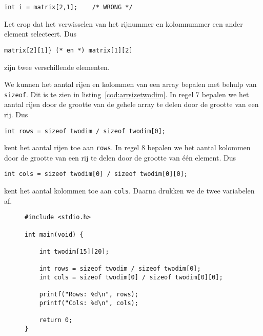 \begin{lstlisting}[style=lstoneline]
int i = matrix[2,1];    /* WRONG */
\end{lstlisting}

Let erop dat het verwisselen van het rijnummer en kolomnummer een ander element selecteert. Dus

\begin{lstlisting}[style=lstoneline]
matrix[2][1]} (* en *) matrix[1][2]
\end{lstlisting}

zijn twee verschillende elementen.

We kunnen het aantal rijen en kolommen van een array bepalen met behulp van \texttt{sizeof}. Dit is te zien in listing~\ref{cod:arrsizetwodim}.
In regel 7 bepalen we het aantal rijen door de grootte van de gehele array te delen door de grootte van een rij. Dus

\begin{lstlisting}[style=lstoneline]
int rows = sizeof twodim / sizeof twodim[0];
\end{lstlisting}

kent het aantal rijen toe aan \texttt{rows}. In regel 8 bepalen we het aantal kolommen door de grootte van een rij te delen door de grootte van één element. Dus

\begin{lstlisting}[style=lstoneline]
int cols = sizeof twodim[0] / sizeof twodim[0][0];
\end{lstlisting}

kent het aantal kolommen toe aan \texttt{cols}. Daarna drukken we de twee variabelen af.

\begin{figure}[!t]
\begin{lstlisting}[caption=Bepalen van het aantal rijen en kolommen.,label=cod:arrsizetwodim]
#include <stdio.h>

int main(void) {

	int twodim[15][20];

	int rows = sizeof twodim / sizeof twodim[0];
	int cols = sizeof twodim[0] / sizeof twodim[0][0];

	printf("Rows: %d\n", rows);
	printf("Cols: %d\n", cols);

	return 0;
}
\end{lstlisting}
\end{figure}
